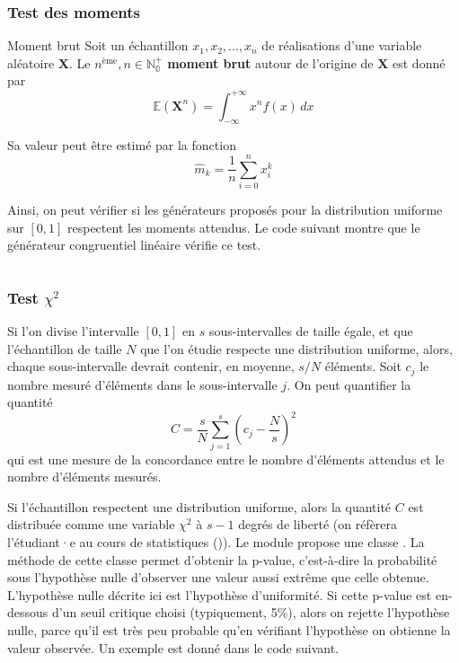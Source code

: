             \subsubsection{Test des moments}
                \begin{definition}{Moment brut}
                    Soit un échantillon $x_1, x_2, ..., x_n$ de réalisations d'une variable aléatoire $\mathbf{X}$. Le $n^{\text{ème}}, n \in \mathbb{N_0^+}$ \textbf{moment brut} autour de l'origine de $\mathbf{X}$ est donné par
                    \begin{equation}
                        \mathbb{E}(\mathbf{X}^n) = \int_{-\infty}^{+\infty} x^n f(x) \, dx
                    \end{equation}
                    
                    Sa valeur peut être estimé par la fonction
                    \begin{equation}
                        \hat{m}_k = \frac1n \sum_{i=0}^n x_i^k
                    \end{equation}
                \end{definition}
                Ainsi, on peut vérifier si les générateurs proposés pour la distribution uniforme sur $[0, 1]$ respectent les moments attendus. Le code suivant montre que le générateur congruentiel linéaire vérifie ce test.
                \inputminted{python}{codes/moments_test.py}

            \subsubsection{Test $\chi^2$}
                Si l'on divise l'intervalle $[0, 1]$ en $s$ sous-intervalles de taille égale, et que l'échantillon de taille $N$ que l'on étudie respecte une distribution uniforme, alors, chaque sous-intervalle devrait contenir, en moyenne, $s/N$ éléments. Soit $c_j$ le nombre mesuré d'éléments dans le sous-intervalle $j$. On peut quantifier la quantité
                \begin{equation}
                    C = \frac{s}{N} \sum_{j=1}^s (c_j - \frac{N}{s})^2
                \end{equation}
                qui est une mesure de la concordance entre le nombre d'éléments attendus et le nombre d'éléments mesurés. 

                Si l'échantillon respectent une distribution uniforme, alors la quantité $C$ est distribuée comme une variable $\chi^2$ à $s-1$ degrés de liberté (on réfèrera l'étudiant·e au cours de statistiques (\cite{mathf315_2})). Le module  propose une classe . La méthode  de cette classe permet d'obtenir la p-value, c'est-à-dire la probabilité sous l'hypothèse nulle d'observer une valeur aussi extrême que celle obtenue. L'hypothèse nulle décrite ici est l'hypothèse d'uniformité. Si cette p-value est en-dessous d'un seuil critique choisi (typiquement, 5\%), alors on rejette l'hypothèse nulle, parce qu'il est très peu probable qu'en vérifiant l'hypothèse on obtienne la valeur observée. Un exemple est donné dans le code suivant.
                \inputminted{python}{codes/chi2_test.py}

